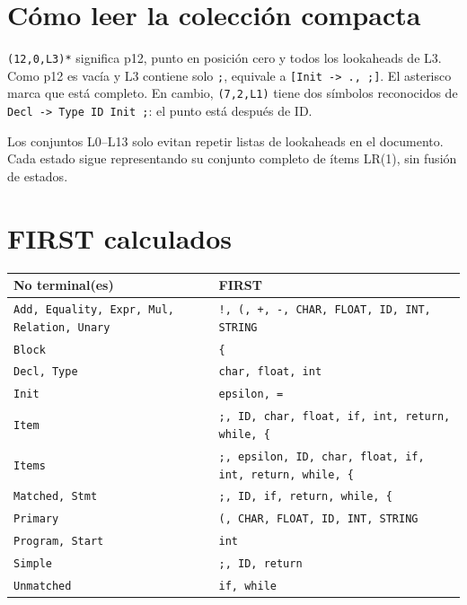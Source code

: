 \section*{Cómo leer la colección compacta}
\texttt{(12,0,L3)*} significa p12, punto en posición cero y todos los lookaheads de L3. Como p12 es vacía y L3 contiene solo \texttt{;}, equivale a \texttt{[Init -> ., ;]}. El asterisco marca que está completo. En cambio, \texttt{(7,2,L1)} tiene dos símbolos reconocidos de \texttt{Decl -> Type ID Init ;}: el punto está después de ID.

Los conjuntos L0--L13 solo evitan repetir listas de lookaheads en el documento. Cada estado sigue representando su conjunto completo de ítems LR(1), sin fusión de estados.
\clearpage
\section*{FIRST calculados}
{\small\begin{longtable}{@{}p{4.5cm}p{11cm}@{}}\toprule No terminal(es)& FIRST\\\midrule\endhead
\texttt{Add, Equality, Expr, Mul, Relation, Unary} & \texttt{!, (, +, -, CHAR, FLOAT, ID, INT, STRING}\\
\texttt{Block} & \texttt{\{}\\
\texttt{Decl, Type} & \texttt{char, float, int}\\
\texttt{Init} & \texttt{epsilon, =}\\
\texttt{Item} & \texttt{;, ID, char, float, if, int, return, while, \{}\\
\texttt{Items} & \texttt{;, epsilon, ID, char, float, if, int, return, while, \{}\\
\texttt{Matched, Stmt} & \texttt{;, ID, if, return, while, \{}\\
\texttt{Primary} & \texttt{(, CHAR, FLOAT, ID, INT, STRING}\\
\texttt{Program, Start} & \texttt{int}\\
\texttt{Simple} & \texttt{;, ID, return}\\
\texttt{Unmatched} & \texttt{if, while}\\
\bottomrule\end{longtable}}
